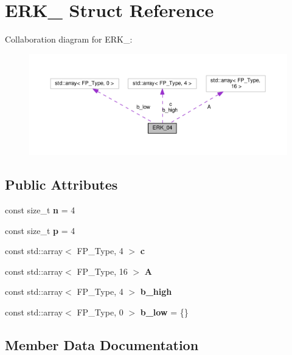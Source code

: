 \hypertarget{structERK__04}{}\section{E\+R\+K\+\_ Struct Reference}
\label{structERK__04}


Collaboration diagram for E\+R\+K\+\_\+:\nopagebreak
\begin{figure}[H]
\begin{center}
\leavevmode
\includegraphics[width=350pt]{structERK__04__coll__graph}
\end{center}
\end{figure}
\subsection*{Public Attributes}
\begin{DoxyCompactItemize}
\item 
\mbox{\label{structERK__04_ad51053d30094b589aad56694c40aa2e3}} 
const size\+\_\+t {\bfseries n} = 4
\item 
\mbox{\label{structERK__04_a0eddad040c14f2cb43c398e3c7a3cdc3}} 
const size\+\_\+t {\bfseries p} = 4
\item 
const std\+::array$<$ F\+P\+\_\+\+Type, 4 $>$ {\bfseries c}
\item 
const std\+::array$<$ F\+P\+\_\+\+Type, 16 $>$ {\bfseries A}
\item 
const std\+::array$<$ F\+P\+\_\+\+Type, 4 $>$ {\bfseries b\+\_\+high}
\item 
\mbox{\label{structERK__04_a6f360ce6a229e0b3606a6d24f4469d5c}} 
const std\+::array$<$ F\+P\+\_\+\+Type, 0 $>$ {\bfseries b\+\_\+low} = \{\}
\end{DoxyCompactItemize}


\subsection{Member Data Documentation}
\mbox{\label{structERK__04_a09c8913d7fa939adfdf8043561160a41}} 
